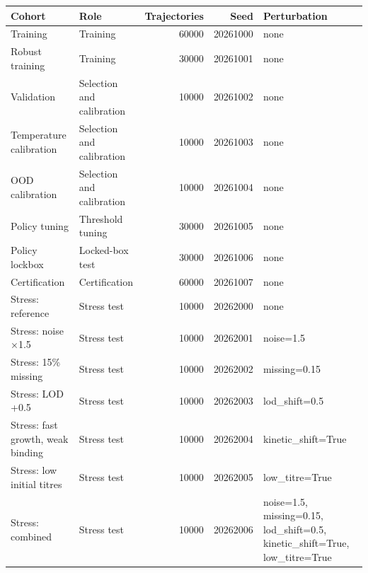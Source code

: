 \begin{tabular}{llrrl}
\toprule
Cohort & Role & Trajectories & Seed & Perturbation \\
\midrule
Training & Training & 60000 & 20261000 & none \\
Robust training & Training & 30000 & 20261001 & none \\
Validation & Selection and calibration & 10000 & 20261002 & none \\
Temperature calibration & Selection and calibration & 10000 & 20261003 & none \\
OOD calibration & Selection and calibration & 10000 & 20261004 & none \\
Policy tuning & Threshold tuning & 30000 & 20261005 & none \\
Policy lockbox & Locked-box test & 30000 & 20261006 & none \\
Certification & Certification & 60000 & 20261007 & none \\
Stress: reference & Stress test & 10000 & 20262000 & none \\
Stress: noise ×1.5 & Stress test & 10000 & 20262001 & noise=1.5 \\
Stress: 15\% missing & Stress test & 10000 & 20262002 & missing=0.15 \\
Stress: LOD +0.5 & Stress test & 10000 & 20262003 & lod\_shift=0.5 \\
Stress: fast growth, weak binding & Stress test & 10000 & 20262004 & kinetic\_shift=True \\
Stress: low initial titres & Stress test & 10000 & 20262005 & low\_titre=True \\
Stress: combined & Stress test & 10000 & 20262006 & noise=1.5, missing=0.15, lod\_shift=0.5, kinetic\_shift=True, low\_titre=True \\
\bottomrule
\end{tabular}
